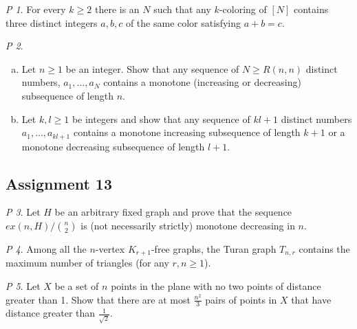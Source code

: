 \documentclass[11pt, fleqn, a4paper, landscape]{article}
\theoremstyle{plain} %
\theoremstyle{remark} %
\newtheorem{problem}{P}
\theoremstyle{definition} %
\begin{document}
\begin{multicols}{5}
\begin{problem}
For every $k\ge 2$ there is an $N$ such that any $k$-coloring of $[N]$ contains three distinct integers $a, b, c$ of the same color satisfying $a + b = c.$
\end{problem}

\begin{problem}
\begin{enumerate}[(a)]
\item Let $n\ge 1$ be an integer. Show that any sequence of $N\ge R(n, n)$  distinct numbers, $a_1,\dots, a_N$ contains a monotone (increasing or decreasing) subsequence of length $n$.
\item Let $k, l \ge1$ be integers and show that any sequence of $kl+1$ distinct numbers $a_1,\dots, a_{kl+1}$ contains a monotone increasing subsequence of length $k + 1$ or a monotone decreasing
subsequence of length $l + 1$.
\end{enumerate}
\end{problem}

\subsection{Assignment 13}

\begin{problem}
Let $H$ be an arbitrary fixed graph and prove that the sequence $ex(n,H)/\binom{n}{2}$ is (not necessarily strictly) monotone decreasing in $n$.
\end{problem}

\begin{problem}
Among all the $n$-vertex $K_{r+1}$-free graphs, the Turan graph $T_{n,r}$ contains the maximum number of triangles (for any $r, n \ge 1$).
\end{problem}

\begin{problem}
Let $X$ be a set of $n$ points in the plane with no two points of distance greater than 1. Show that there are at most $\frac{n^2}{3}$ pairs of points in $X$ that have distance greater than $\frac{1}{\sqrt{2}}$.
\end{problem}


\end{multicols}
\end{document}
